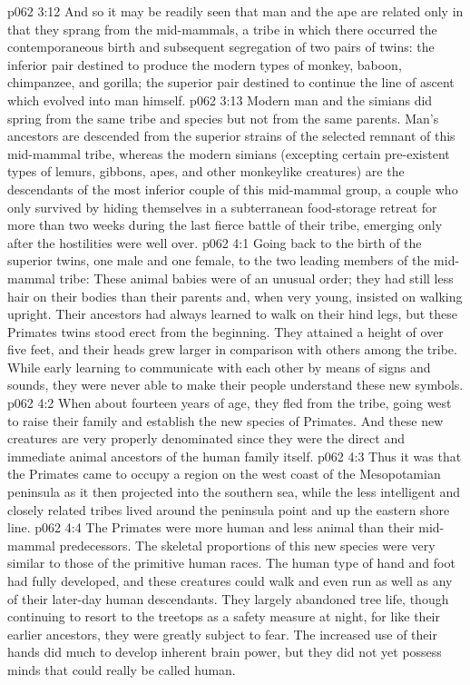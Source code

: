 \vs p062 3:12 And so it may be readily seen that man and the ape are related only in that they sprang from the mid\hyp{}mammals, a tribe in which there occurred the contemporaneous birth and subsequent segregation of two pairs of twins: the inferior pair destined to produce the modern types of monkey, baboon, chimpanzee, and gorilla; the superior pair destined to continue the line of ascent which evolved into man himself.
\vs p062 3:13 Modern man and the simians did spring from the same tribe and species but not from the same parents. Man’s ancestors are descended from the superior strains of the selected remnant of this mid\hyp{}mammal tribe, whereas the modern simians (excepting certain pre\hyp{}existent types of lemurs, gibbons, apes, and other monkeylike creatures) are the descendants of the most inferior couple of this mid\hyp{}mammal group, a couple who only survived by hiding themselves in a subterranean food\hyp{}storage retreat for more than two weeks during the last fierce battle of their tribe, emerging only after the hostilities were well over.
\vs p062 4:1 Going back to the birth of the superior twins, one male and one female, to the two leading members of the mid\hyp{}mammal tribe: These animal babies were of an unusual order; they had still less hair on their bodies than their parents and, when very young, insisted on walking upright. Their ancestors had always learned to walk on their hind legs, but these Primates twins stood erect from the beginning. They attained a height of over five feet, and their heads grew larger in comparison with others among the tribe. While early learning to communicate with each other by means of signs and sounds, they were never able to make their people understand these new symbols.
\vs p062 4:2 When about fourteen years of age, they fled from the tribe, going west to raise their family and establish the new species of Primates. And these new creatures are very properly denominated  since they were the direct and immediate animal ancestors of the human family itself.
\vs p062 4:3 Thus it was that the Primates came to occupy a region on the west coast of the Mesopotamian peninsula as it then projected into the southern sea, while the less intelligent and closely related tribes lived around the peninsula point and up the eastern shore line.
\pc \vs p062 4:4 The Primates were more human and less animal than their mid\hyp{}mammal predecessors. The skeletal proportions of this new species were very similar to those of the primitive human races. The human type of hand and foot had fully developed, and these creatures could walk and even run as well as any of their later\hyp{}day human descendants. They largely abandoned tree life, though continuing to resort to the treetops as a safety measure at night, for like their earlier ancestors, they were greatly subject to fear. The increased use of their hands did much to develop inherent brain power, but they did not yet possess minds that could really be called human.
